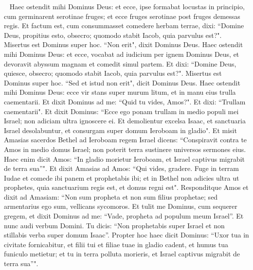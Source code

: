 \begin{biblechapter}   
\verse Haec ostendit mihi Dominus Deus: et ecce, ipse formabat locustas in principio, cum germinarent serotinae fruges; et ecce fruges serotinae post fruges demessas regis. 
\verse Et factum est, cum consummasset comedere herbam terrae, dixi: “Domine Deus, propitius esto, obsecro; quomodo stabit Iacob, quia parvulus est?". 
\verse Misertus est Dominus super hoc. “Non erit", dixit Dominus Deus. 
\verse Haec ostendit mihi Dominus Deus: et ecce, vocabat ad iudicium per ignem Dominus Deus, et devoravit abyssum magnam et comedit simul partem. 
\verse Et dixi: “Domine Deus, quiesce, obsecro; quomodo stabit Iacob, quia parvulus est?". 
\verse Misertus est Dominus super hoc. “Sed et istud non erit", dicit Dominus Deus. 
\verse Haec ostendit mihi Dominus Deus: ecce vir stans super murum litum, et in manu eius trulla caementarii. 
\verse Et dixit Dominus ad me: “Quid tu vides, Amos?". Et dixi: “Trullam caementarii". Et dixit Dominus: “Ecce ego ponam trullam in medio populi mei Israel; non adiciam ultra ignoscere ei. 
\verse Et demolientur excelsa Isaac, et sanctuaria Israel desolabuntur, et consurgam super domum Ieroboam in gladio". 
\verse Et misit Amasias sacerdos Bethel ad Ieroboam regem Israel dicens: “Conspiravit contra te Amos in medio domus Israel; non poterit terra sustinere universos sermones eius. 
\verse Haec enim dicit Amos: “In gladio morietur Ieroboam, et Israel captivus migrabit de terra sua”". 
\verse Et dixit Amasias ad Amos: “Qui vides, gradere. Fuge in terram Iudae et comede ibi panem et prophetabis ibi; 
\verse et in Bethel non adicies ultra ut prophetes, quia sanctuarium regis est, et domus regni est". 
\verse Responditque Amos et dixit ad Amasiam: “Non sum propheta et non sum filius prophetae; sed armentarius ego sum, vellicans sycomoros. 
\verse Et tulit me Dominus, cum sequerer gregem, et dixit Dominus ad me: “Vade, propheta ad populum meum Israel”. 
\verse Et nunc audi verbum Domini. Tu dicis: “Non prophetabis super Israel et non stillabis verba super domum Isaac”. 
\verse Propter hoc haec dicit Dominus: “Uxor tua in civitate fornicabitur, et filii tui et filiae tuae in gladio cadent, et humus tua funiculo metietur; et tu in terra polluta morieris, et Israel captivus migrabit de terra sua”". 
\end{biblechapter}

